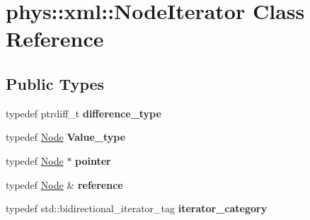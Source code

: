\hypertarget{classphys_1_1xml_1_1NodeIterator}{
\section{phys::xml::NodeIterator Class Reference}
\label{da/d4f/classphys_1_1xml_1_1NodeIterator}
}
\subsection*{Public Types}
\begin{DoxyCompactItemize}
\item 
\hypertarget{classphys_1_1xml_1_1NodeIterator_a2f5acd5f69654c26de62c2f63c988c43}{
typedef ptrdiff\_\-t {\bfseries difference\_\-type}}
\label{da/d4f/classphys_1_1xml_1_1NodeIterator_a2f5acd5f69654c26de62c2f63c988c43}

\item 
\hypertarget{classphys_1_1xml_1_1NodeIterator_ade64f92ce7164fc9297225c98b0973a2}{
typedef \hyperlink{classphys_1_1xml_1_1Node}{Node} {\bfseries Value\_\-type}}
\label{da/d4f/classphys_1_1xml_1_1NodeIterator_ade64f92ce7164fc9297225c98b0973a2}

\item 
\hypertarget{classphys_1_1xml_1_1NodeIterator_a197734b49841230f6162cac3f304befb}{
typedef \hyperlink{classphys_1_1xml_1_1Node}{Node} $\ast$ {\bfseries pointer}}
\label{da/d4f/classphys_1_1xml_1_1NodeIterator_a197734b49841230f6162cac3f304befb}

\item 
\hypertarget{classphys_1_1xml_1_1NodeIterator_a5ee512d5fc1fd4fc9ab3d6eaefd83c87}{
typedef \hyperlink{classphys_1_1xml_1_1Node}{Node} \& {\bfseries reference}}
\label{da/d4f/classphys_1_1xml_1_1NodeIterator_a5ee512d5fc1fd4fc9ab3d6eaefd83c87}

\item 
\hypertarget{classphys_1_1xml_1_1NodeIterator_a98c5f86374f6d5133ed91ed2610cb73a}{
typedef std::bidirectional\_\-iterator\_\-tag {\bfseries iterator\_\-category}}
\label{da/d4f/classphys_1_1xml_1_1NodeIterator_a98c5f86374f6d5133ed91ed2610cb73a}

\end{DoxyCompactItemize}
